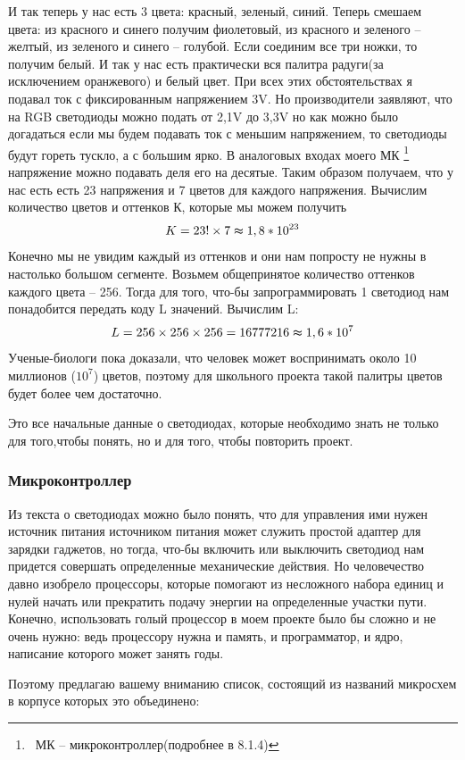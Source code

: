 \documentclass[a4paper, 12pt]{article}
\begin{document}
И так теперь у нас есть 3 цвета: красный, зеленый, синий.
Теперь смешаем цвета: из красного и синего получим фиолетовый,
из красного и зеленого -- желтый, из зеленого и синего -- голубой.
Если соединим все три ножки, то получим белый.
И так у нас есть практически вся палитра радуги(за исключением оранжевого)
и белый цвет. При всех этих обстоятельствах я подавал ток с фиксированным напряжением
3V. Но производители заявляют, что на RGB светодиоды можно подать от 2,1V до 3,3V но
как можно было догадаться если мы будем подавать ток с меньшим напряжением, то светодиоды
будут гореть тускло, а с большим ярко. В аналоговых входах моего МК
\footnote{\ МК -- микроконтроллер(подробнее в 8.1.4)}
напряжение можно подавать деля его на десятые. Таким образом получаем, что у
нас есть есть 23 напряжения и 7 цветов для каждого напряжения. Вычислим
количество цветов и оттенков К, которые мы можем получить $$K=23!\times
  7\thickapprox 1,8*10^{23}$$ Конечно мы не увидим каждый из оттенков и они нам
попросту не нужны в настолько большом сегменте. Возьмем общепринятое количество
оттенков каждого цвета -- 256. Тогда для того, что-бы запрограммировать 1
светодиод нам понадобится передать коду L значений. Вычислим L: $$L=256\times
  256\times 256= 16777216 \thickapprox 1,6*10^7$$ Ученые-биологи пока доказали,
что человек может воспринимать около 10 миллионов ($10^7$) цветов, поэтому для
школьного проекта такой палитры цветов будет более чем достаточно.

Это все начальные данные о светодиодах, которые необходимо знать не только для
того,чтобы понять, но и для того, чтобы повторить проект.

\subsubsection{Микроконтроллер}

Из текста о светодиодах можно было понять, что для управления ими нужен
источник питания источником питания может служить простой адаптер для зарядки
гаджетов, но тогда, что-бы включить или выключить светодиод нам придется
совершать определенные механические действия. Но человечество давно изобрело
процессоры, которые помогают из несложного набора единиц и нулей начать или
прекратить подачу энергии на определенные участки пути. Конечно, использовать
голый процессор в моем проекте было бы сложно и не очень нужно: ведь процессору
нужна и память, и программатор, и ядро, написание которого может занять годы.

Поэтому предлагаю вашему вниманию список, состоящий из названий микросхем в
корпусе которых это объединено:
\end{document}
